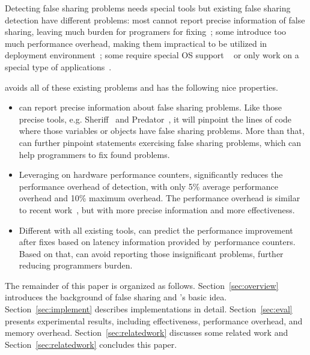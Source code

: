 Detecting false sharing problems needs special tools but existing false sharing detection have different problems: most cannot report precise information of false sharing, leaving much burden for programers for fixing~\cite{falseshare:binaryinstrumentation1,detect:ptu,detect:intel,falseshare:binaryinstrumentation2,DProf, qinzhao, OSdetection, mldetect, Wicaksono11detectingfalse, openmp}; some introduce too much performance overhead, making them impractical to be utilized in deployment environment~\cite{falseshare:binaryinstrumentation1,falseshare:binaryinstrumentation2,falseshare:simulator, Predator}; some require special OS support ~\cite{OSdetection} or only work on a special type of applications~\cite{sheriff}.

\vspace{0.2in}

\cheetah{} avoids all of these existing problems and has the following nice properties.

\begin{itemize} 
\item \cheetah{} can report precise information about false sharing problems. Like those precise tools, e.g. Sheriff~\cite{sheriff} and Predator~\cite{Predator}, it will pinpoint the lines of code where those variables or objects have false sharing problems. More than that, \cheetah{} can further pinpoint statements exercising false sharing problems, which can help programmers to fix found problems. 

\item Leveraging on hardware performance counters, \cheetah{} significantly reduces the performance overhead of detection, with only 5\% average performance overhead and 10\% maximum overhead. The performance overhead is similar to recent work~\cite{mldetect, openmp}, but with more precise information and more effectiveness.
  
\item Different with all existing tools, \Cheetah{} can predict the performance improvement after fixes based on latency information provided by performance counters. Based on that, \Cheetah{} can avoid reporting those insignificant problems, further reducing programmers burden. 

\end{itemize}

The remainder of this paper is organized as follows. Section~\ref{sec:overview} introduces the background of false sharing and \cheetah{}'s basic idea. Section~\ref{sec:implement} describes implementations in detail. Section~\ref{sec:eval} presents experimental results, including effectiveness, performance overhead, and memory overhead. Section~\ref{sec:relatedwork} discusses some related work and Section~\ref{sec:relatedwork} concludes this paper. 



